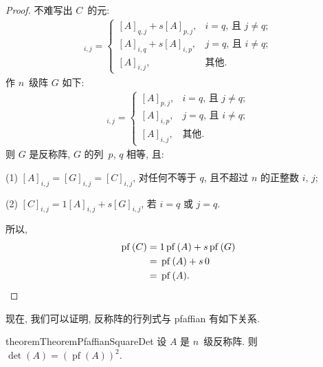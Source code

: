 \begin{proof}
    不难写出 \(C\)~的元:
    \begin{align*}
        [C]_{i,j} =
        \begin{cases}
            [A]_{q,j} + s[A]_{p,j},
             & \text{\(i = q\), 且 \(j \neq q\)}; \\
            [A]_{i,q} + s[A]_{i,p},
             & \text{\(j = q\), 且 \(i \neq q\)}; \\
            [A]_{i,j},
             & \text{其他}.
        \end{cases}
    \end{align*}
    作 \(n\)~级阵 \(G\) 如下:
    \begin{align*}
        [G]_{i,j} =
        \begin{cases}
            [A]_{p,j}, & \text{\(i = q\), 且 \(j \neq q\)}; \\
            [A]_{i,p}, & \text{\(j = q\), 且 \(i \neq q\)}; \\
            [A]_{i,j}, & \text{其他}.
        \end{cases}
    \end{align*}
    则 \(G\) 是反称阵, \(G\) 的列~\(p\), \(q\) 相等,
    且:

    (1)
    \([A]_{i,j} = [G]_{i,j} = [C]_{i,j}\),
    对任何不等于 \(q\), 且不超过 \(n\) 的正整数 \(i\), \(j\);

    (2)
    \([C]_{i,j} = 1[A]_{i,j} + s[G]_{i,j}\),
    若 \(i = q\) 或 \(j = q\).

    所以,
    \begin{align*}
        \operatorname{pf} {(C)}
        = {} &
        1 \operatorname{pf} {(A)} + s \operatorname{pf} {(G)}
        \\
        = {} &
        \operatorname{pf} {(A)} + s \, 0
        \\
        = {} &
        \operatorname{pf} {(A)}.
        \qedhere
    \end{align*}
\end{proof}

现在, 我们可以证明,
反称阵的行列式与 pfaffian 有如下关系.

\begin{restatable}{theorem}{TheoremPfaffianSquareDet}
    设 \(A\) 是 \(n\)~级反称阵.
    则 \(\det {(A)}
    = (\operatorname{pf} {(A)})^2\).
\end{restatable}

